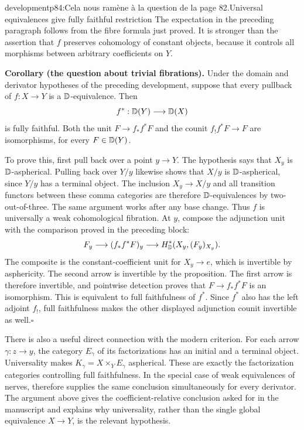 \begin{dcomment}{development}{p84:Cela nous ramène à la question de la page 82.}{Universal equivalences give fully faithful restriction}
The expectation in the preceding paragraph follows from the fibre formula just proved. It is stronger than the assertion that $f$ preserves cohomology of constant objects, because it controls all morphisms between arbitrary coefficients on $Y$.

\textbf{Corollary (the question about trivial fibrations).}\ours
Under the domain and derivator hypotheses of the preceding development, suppose that every pullback of $f:X\to Y$ is a $\mathbb{D}$-equivalence. Then
\[
 f^*:\mathbb{D}(Y)\longrightarrow\mathbb{D}(X)
\]
is fully faithful. Both the unit $F\to f_*f^*F$ and the counit $f_!f^*F\to F$ are isomorphisms, for every $F\in\mathbb{D}(Y)$.

To prove this, first pull back over a point $y\to Y$. The hypothesis says that $X_y$ is $\mathbb{D}$-aspherical. Pulling back over $Y/y$ likewise shows that $X/y$ is $\mathbb{D}$-aspherical, since $Y/y$ has a terminal object. The inclusion $X_y\to X/y$ and all transition functors between these comma categories are therefore $\mathbb{D}$-equivalences by two-out-of-three. The same argument works after any base change. Thus $f$ is universally a weak cohomological fibration. At $y$, compose the adjunction unit with the comparison proved in the preceding block:
\[
 F_y\longrightarrow(f_*f^*F)_y
 \longrightarrow H^*_{\mathbb{D}}(X_y,(F_y)_{X_y}).
\]
The composite is the constant-coefficient unit for $X_y\to e$, which is invertible by asphericity. The second arrow is invertible by the proposition. The first arrow is therefore invertible, and pointwise detection proves that $F\to f_*f^*F$ is an isomorphism. This is equivalent to full faithfulness of $f^*$. Since $f^*$ also has the left adjoint $f_!$, full faithfulness makes the other displayed adjunction counit invertible as well.\hfill$\square$

There is also a useful direct connection with the modern criterion. For each arrow $\gamma:z\to y$, the category $E_\gamma$ of its factorizations has an initial and a terminal object. Universality makes $K_\gamma=X\times_YE_\gamma$ aspherical. These are exactly the factorization categories controlling full faithfulness. In the special case of weak equivalences of nerves, \citet[Theorem 6.10]{GrothStovicek2016Trees} therefore supplies the same conclusion simultaneously for every derivator. The argument above gives the coefficient-relative conclusion asked for in the manuscript and explains why universality, rather than the single global equivalence $X\to Y$, is the relevant hypothesis.
\end{dcomment}



